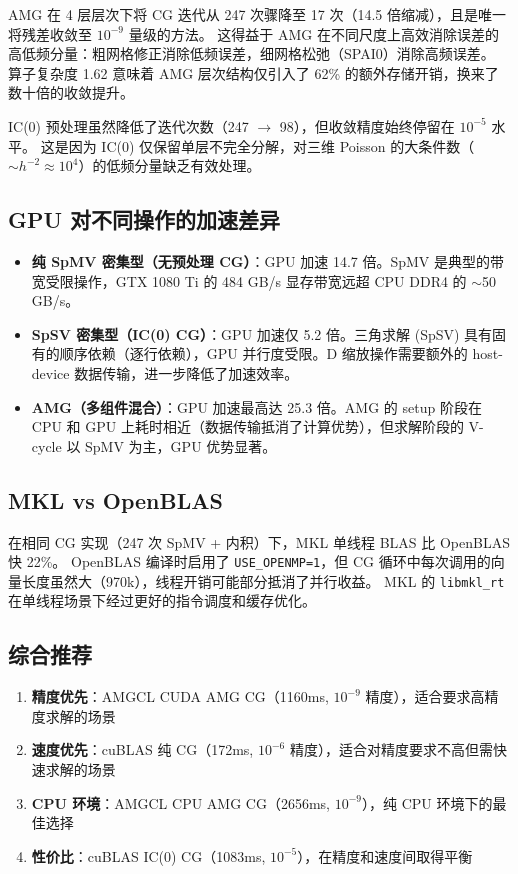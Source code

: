 \documentclass[12pt,a4paper]{ctexart}
\begin{document}
AMG 在 4 层层次下将 CG 迭代从 247 次骤降至 17 次（14.5 倍缩减），且是唯一将残差收敛至 $10^{-9}$ 量级的方法。
这得益于 AMG 在不同尺度上高效消除误差的高低频分量：粗网格修正消除低频误差，细网格松弛（SPAI0）消除高频误差。
算子复杂度 1.62 意味着 AMG 层次结构仅引入了 62\% 的额外存储开销，换来了数十倍的收敛提升。

IC(0) 预处理虽然降低了迭代次数（247 $\to$ 98），但收敛精度始终停留在 $10^{-5}$ 水平。
这是因为 IC(0) 仅保留单层不完全分解，对三维 Poisson 的大条件数（$\sim h^{-2} \approx 10^4$）的低频分量缺乏有效处理。

\subsection{GPU 对不同操作的加速差异}

\begin{itemize}
\item \textbf{纯 SpMV 密集型（无预处理 CG）}：GPU 加速 14.7 倍。SpMV 是典型的带宽受限操作，GTX 1080 Ti 的 484 GB/s 显存带宽远超 CPU DDR4 的 $\sim$50 GB/s。
\item \textbf{SpSV 密集型（IC(0) CG）}：GPU 加速仅 5.2 倍。三角求解 (SpSV) 具有固有的顺序依赖（逐行依赖），GPU 并行度受限。D 缩放操作需要额外的 host-device 数据传输，进一步降低了加速效率。
\item \textbf{AMG（多组件混合）}：GPU 加速最高达 25.3 倍。AMG 的 setup 阶段在 CPU 和 GPU 上耗时相近（数据传输抵消了计算优势），但求解阶段的 V-cycle 以 SpMV 为主，GPU 优势显著。
\end{itemize}

\subsection{MKL vs OpenBLAS}

在相同 CG 实现（247 次 SpMV + 内积）下，MKL 单线程 BLAS 比 OpenBLAS 快 22\%。
OpenBLAS 编译时启用了 \texttt{USE\_OPENMP=1}，但 CG 循环中每次调用的向量长度虽然大（970k），线程开销可能部分抵消了并行收益。
MKL 的 \texttt{libmkl\_rt} 在单线程场景下经过更好的指令调度和缓存优化。

\subsection{综合推荐}

\begin{enumerate}
\item \textbf{精度优先}：AMGCL CUDA AMG CG（1160ms, $10^{-9}$ 精度），适合要求高精度求解的场景
\item \textbf{速度优先}：cuBLAS 纯 CG（172ms, $10^{-6}$ 精度），适合对精度要求不高但需快速求解的场景
\item \textbf{CPU 环境}：AMGCL CPU AMG CG（2656ms, $10^{-9}$），纯 CPU 环境下的最佳选择
\item \textbf{性价比}：cuBLAS IC(0) CG（1083ms, $10^{-5}$），在精度和速度间取得平衡
\end{enumerate}
\end{document}
